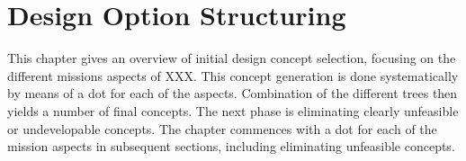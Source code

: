 \section{Design Option Structuring} \label{ch:design}
This chapter gives an overview of initial design concept selection, focusing on the different missions aspects of XXX. This concept generation is done systematically by means of a \gls{dot} for each of the aspects. Combination of the different trees then yields a number of final concepts. The next phase is eliminating clearly unfeasible or undevelopable concepts. The chapter commences with a \gls{dot} for each of the mission aspects in subsequent sections, including eliminating unfeasible concepts.

%
%

